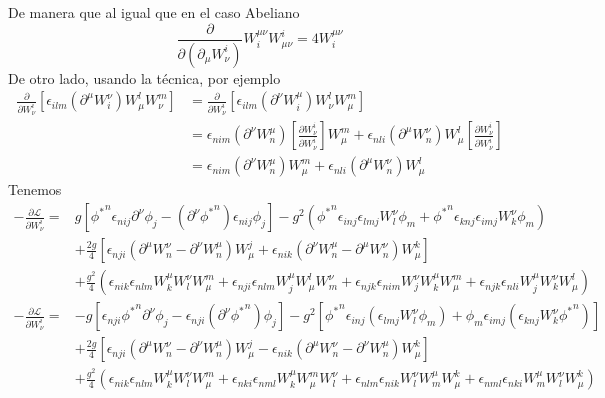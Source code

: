 De manera que al igual que en el caso Abeliano
\begin{equation}
\frac{\partial}{\partial(\partial_\mu W_\nu^i)}W^{\mu\nu}_i W_{\mu\nu}^i=4W^{\mu\nu}_i  
\end{equation}
De otro lado, usando la t\'ecnica, por ejemplo
\begin{align}
    \frac{\partial}{\partial W^i_\nu}\left[\epsilon_{ilm}(\partial^\mu W^\nu_i)W^l_\mu W^m_\nu\right]
    &=\frac{\partial}{\partial W^i_\nu}\left[\epsilon_{ilm}(\partial^\nu W^\mu_i)W^l_\nu W^m_\mu\right]\nonumber\\
    &=\epsilon_{nim}(\partial^\nu W^\mu_n)\left[\frac{\partial W^i_\nu}{\partial W^i_\nu}\right] W^m_\mu+
    \epsilon_{nli}(\partial^\mu W^\nu_n)W^l_\mu\left[\frac{\partial W^i_\nu}{\partial W^i_\nu}\right] \nonumber\\
    &=\epsilon_{nim}(\partial^\nu W^\mu_n)W^m_\mu+\epsilon_{nli}(\partial^\mu W^\nu_n)W^l_\mu 
\end{align}
Tenemos
\begin{align}
  -\frac{\partial\mathcal{L}}{\partial W^i_\nu}=&g\left[{\phi^*}^n\epsilon_{nij} \partial^\nu\phi_j-\left(\partial^\nu{\phi^*}^n\right)\epsilon_{nij}\phi_j\right]
-g^2({\phi^*}^n\epsilon_{inj}\epsilon_{lmj}W^\nu_l \phi_m+{\phi^*}^n\epsilon_{knj}\epsilon_{imj}W^\nu_k \phi_m)\nonumber\\
&+\frac{2g}{4}[\epsilon_{nji}(\partial^\mu W^\nu_n-\partial^\nu W^\mu_n)W_\mu^j+\epsilon_{nik}(\partial^\nu W^\mu_n-\partial^\mu W^\nu_n)W^k_\mu]\nonumber\\
&+\frac{g^2}{4}(\epsilon_{nik}\epsilon_{nlm}W^\mu_k W^\nu_l W_\mu^m+\epsilon_{nji}\epsilon_{nlm}W^\mu_j W^l_\mu W^\nu_m
+\epsilon_{njk}\epsilon_{nim}W^\nu_j W^\mu_k W^m_\mu+\epsilon_{njk}\epsilon_{nli}W^\mu_j W^\nu_k W^l_\mu)\nonumber
\end{align}
\begin{align}
  -\frac{\partial\mathcal{L}}{\partial W^i_\nu}=&-g\left[\epsilon_{nji}{\phi^*}^n \partial^\nu\phi_j-\epsilon_{nji}\left(\partial^\nu{\phi^*}^n\right)\phi_j\right]
-g^2[{\phi^*}^n\epsilon_{inj}(\epsilon_{lmj}W^\nu_l \phi_m)+\phi_m\epsilon_{imj}(\epsilon_{knj}W^\nu_k {\phi^*}^n)]\nonumber\\
&+\frac{2g}{4}[\epsilon_{nji}(\partial^\mu W^\nu_n-\partial^\nu W^\mu_n)W_\mu^j-\epsilon_{nik}(\partial^\mu W^\nu_n-\partial^\nu W^\mu_n)W^k_\mu]\nonumber\\
&+\frac{g^2}{4}(\epsilon_{nik}\epsilon_{nlm}W^\mu_k W^\nu_l W_\mu^m+\epsilon_{nki}\epsilon_{nml}W^\mu_k W^m_\mu W^\nu_l
+\epsilon_{nlm}\epsilon_{nik}W^\nu_l W^\mu_m W^k_\mu+\epsilon_{nml}\epsilon_{nki}W^\mu_m W^\nu_l W^k_\mu)\nonumber
\end{align}
